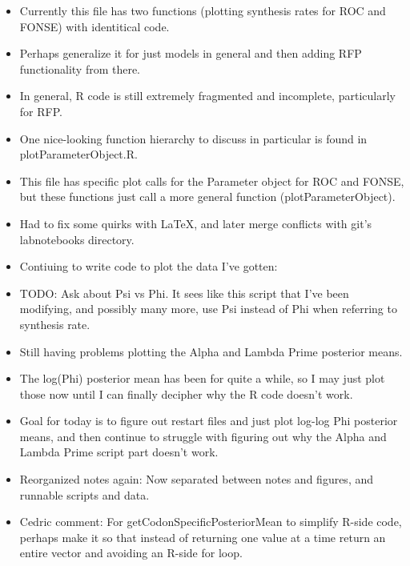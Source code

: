 \documentclass[12pt,hyperref]{labbook}
\begin{document}
\begin{itemize}
    \item Currently this file has two functions (plotting synthesis rates for ROC and FONSE) with identitical code.
    \item Perhaps generalize it for just models in general and then adding RFP functionality from there.
    \item In general, R code is still extremely fragmented and incomplete, particularly for RFP.
    \item One nice-looking function hierarchy to discuss in particular is found in plotParameterObject.R.
    \item This file has specific plot calls for the Parameter object for ROC and FONSE, but these functions just call a more general function (plotParameterObject).
\end{itemize}


\begin{itemize}
    \item Had to fix some quirks with LaTeX, and later merge conflicts with git's labnotebooks directory.
    \item Contiuing to write code to plot the data I've gotten:
    \item TODO: Ask about Psi vs Phi. 
    It sees like this script that I've been modifying, and possibly many more, use Psi instead of Phi when referring to synthesis rate.
    \item Still having problems plotting the Alpha and Lambda Prime posterior means.
    \item The log(Phi) posterior mean has been for quite a while, so I may just plot those now until I can finally decipher why the R code doesn't work.
\end{itemize}


\begin{itemize}
    \item Goal for today is to figure out restart files and just plot log-log Phi posterior means, and then continue to struggle with figuring out why the Alpha and Lambda Prime script part doesn't work.
    \item Reorganized notes again: Now separated between notes and figures, and runnable scripts and data.
    \item Cedric comment: For getCodonSpecificPosteriorMean to simplify R-side code, perhaps make it so that instead of returning one value at a time return an entire vector and avoiding an R-side for loop.
\end{itemize}
\end{document}

